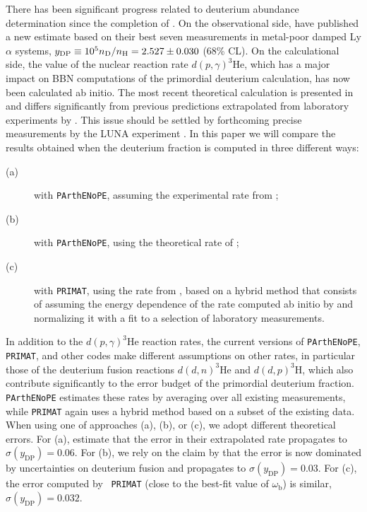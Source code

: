 \documentclass[longauth,traditabstract]{aa}
\def\,{\thinspace}
\newcommand{\parthenope}{{\tt PArthENoPE}}
\providecommand{\omb}{\omega_{\mathrm{b}}}
\newcommand{\paramsII}{\citetalias{planck2014-a15}}
\begin{document}
 There has been significant progress related to deuterium abundance determination since the completion of \paramsII.
On the observational side, \cite{Cooke:2017cwo} have published a new estimate based on their best seven measurements in metal-poor damped Ly\,$\alpha$ systems,
$y_\mathrm{DP} \equiv 10^5 n_{\rm D}/n_{\rm H} = 2.527 \pm 0.030$ (68\,\% CL). On the calculational side, the value of the nuclear reaction rate $d(p,\gamma)^3 \mbox{He}$,
which has a major impact on BBN computations of the primordial deuterium calculation, has now been calculated ab initio.
The most recent theoretical calculation is presented in \citet[][leading to a smaller value of $y_\mathrm{DP}$]{Marcucci:2015yla} and differs significantly
from previous predictions extrapolated from laboratory experiments by \cite{Adelberger:2010qa}. This issue should be settled by forthcoming precise measurements by the LUNA experiment \citep{2017EPJWC.13601009G}. In this paper we will compare the results obtained when the deuterium fraction is computed in three different ways:
\begin{description}
\item[(a)] with \parthenope{}, assuming the experimental rate from \cite{Adelberger:2010qa};
\item[(b)] with \parthenope{}, using the theoretical rate of \cite{Marcucci:2015yla};
\item[(c)] with {\tt PRIMAT}, using the rate from \cite{Iliadis:2016vkw}, based on a hybrid method
 that consists of assuming the energy dependence of the rate computed ab initio by \cite{Marcucci:2005zc}
 and normalizing it with a fit to a selection of laboratory measurements.

\end{description}
In addition to the $d(p,\gamma)^3 \mbox{He}$ reaction rates, the current
versions of \parthenope{}, {\tt PRIMAT}, and other codes
\citep[such as that developed by][]{Nollett:2000fh,Nollett:2011aa} make
different assumptions on other rates, in particular those of the
deuterium fusion reactions $d(d,n)^3$He and $d(d,p)^3$H, which also
contribute significantly to the error budget of the primordial
deuterium fraction. \parthenope{} estimates these rates by averaging
over all existing measurements, while {\tt PRIMAT} again uses a hybrid
method based on a subset of the existing data. When using one of approaches
(a), (b), or (c), we adopt different theoretical errors. For
(a), \cite{Adelberger:2010qa} estimate that the error in their
extrapolated rate propagates to $\sigma(y_\mathrm{DP})=0.06$. For (b),
we rely on the claim by \cite{Marcucci:2015yla} that the error is now
dominated by uncertainties on deuterium fusion and propagates to
$\sigma(y_\mathrm{DP})=0.03$. For (c), the error computed by {\tt
PRIMAT} (close to the best-fit value of $\omb$) is similar,
$\sigma(y_\mathrm{DP})=0.032$.
\end{document}
